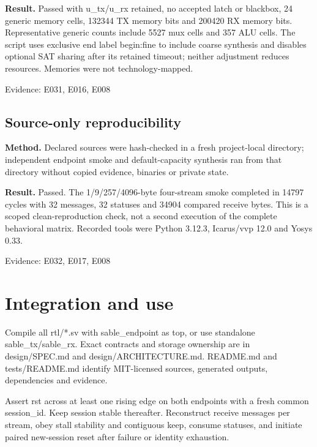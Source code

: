 \documentclass[11pt,a4paper]{article}
\begin{document}
\textbf{Result.} Passed with u\_\allowbreak{}tx/\allowbreak{}u\_\allowbreak{}rx retained,\allowbreak{} no accepted latch or blackbox,\allowbreak{} 24 generic memory cells,\allowbreak{} 132344 TX memory bits and 200420 RX memory bits. Representative generic counts include 5527 mux cells and 357 ALU cells. The script uses exclusive end label begin:fine to include coarse synthesis and disables optional SAT sharing after its retained timeout; neither adjustment reduces resources. Memories were not technology-mapped.

{\small Evidence: E031,\allowbreak{} E016,\allowbreak{} E008}

\subsection{Source-only reproducibility}

\textbf{Method.} Declared sources were hash-checked in a fresh project-local directory; independent endpoint smoke and default-capacity synthesis ran from that directory without copied evidence,\allowbreak{} binaries or private state.

\textbf{Result.} Passed. The 1/\allowbreak{}9/\allowbreak{}257/\allowbreak{}4096-byte four-stream smoke completed in 14797 cycles with 32 messages,\allowbreak{} 32 statuses and 34904 compared receive bytes. This is a scoped clean-reproduction check,\allowbreak{} not a second execution of the complete behavioral matrix. Recorded tools were Python 3.12.3,\allowbreak{} Icarus/\allowbreak{}vvp 12.0 and Yosys 0.33.

{\small Evidence: E032,\allowbreak{} E017,\allowbreak{} E008}

\section{Integration and use}

Compile all rtl/\allowbreak{}*\allowbreak{}.sv with sable\_\allowbreak{}endpoint as top,\allowbreak{} or use standalone sable\_\allowbreak{}tx/\allowbreak{}sable\_\allowbreak{}rx. Exact contracts and storage ownership are in design/\allowbreak{}SPEC.md and design/\allowbreak{}ARCHITECTURE.md. README.md and tests/\allowbreak{}README.md identify MIT-licensed sources,\allowbreak{} generated outputs,\allowbreak{} dependencies and evidence.


Assert rst across at least one rising edge on both endpoints with a fresh common session\_\allowbreak{}id. Keep session stable thereafter. Reconstruct receive messages per stream,\allowbreak{} obey stall stability and contiguous keep,\allowbreak{} consume statuses,\allowbreak{} and initiate paired new-session reset after failure or identity exhaustion.
\end{document}
